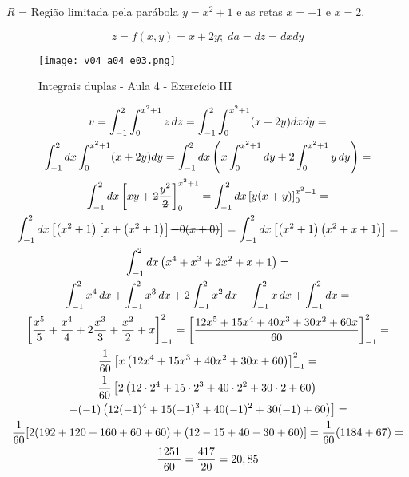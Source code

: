 \begin{enumerate}
	$R$ = Região limitada pela parábola $y = x^2 + 1$ e as retas $x = -1$ e $x = 2$.
	
	\begin{equation*}
		z = f(x,y) = x + 2y;\; da = dz = dx dy
	\end{equation*}
	
	\begin{figure}[htb]
		\caption{Integrais duplas - Aula 4 - Exercício III}
		\label{v04_a04_e03}
		\centering
		\texttt{[image: v04\_a04\_e03.png]}		
	\end{figure}
	
	\begin{gather*}
		v = \int_{-1}^2 \int_0^{x^2 + 1} z\, dz = \int_{-1}^2 \int_0^{x^2 + 1} (x + 2y) dx dy =\\ \int_{-1}^2 dx \int_0^{x^2 + 1} (x + 2y) dy = \int_{-1}^2 dx \left(x\int_0^{x^2 + 1} dy + 2\int_0^{x^2 + 1} y\, dy\right) =\\ \int_{-1}^2 dx \left[xy + \overstrike{2}\dfrac{y^2}{\overstrike{2}}\right]_0^{x^2 + 1} = \int_{-1}^2 dx \left[y(x + y)\right]_0^{x^2 + 1} =\\ \int_{-1}^2 dx \left[\left(x^2 + 1\right)\left[x + \left(x^2 + 1\right)\right] \overstrike{- 0(x + 0)}\right] = \int_{-1}^2 dx \left[\left(x^2 + 1\right)\left(x^2 + x + 1\right)\right] =\\ \int_{-1}^2 dx \left(x^4 + x^3 + 2x^2 + x + 1\right) =\\ \int_{-1}^2 x^4\, dx + \int_{-1}^2 x^3\, dx + 2\int_{-1}^2 x^2\, dx + \int_{-1}^2 x\, dx + \int_{-1}^2 dx =\\ \left[\dfrac{x^5}{5} + \dfrac{x^4}{4} + 2\dfrac{x^3}{3} + \dfrac{x^2}{2} + x\right]_{-1}^2 = \left[\dfrac{12x^5 + 15x^4 + 40x^3 + 30x^2 + 60x}{60}\right]_{-1}^2 =\\ \dfrac{1}{60}\left[x\left(12x^4 + 15x^3 + 40x^2 + 30x + 60\right)\right]_{-1}^2 =\\ \dfrac{1}{60}\left[2\left(12\cdot2^4 + 15\cdot2^3 + 40\cdot2^2 + 30\cdot2 + 60\right) \right.\\\left.- (-1)\left(12(-1)^4 + 15(-1)^3 + 40(-1)^2 + 30(-1) + 60\right)\right] =\\ \dfrac{1}{60} [2(192 + 120 + 160 + 60 + 60) + (12 - 15 + 40 - 30 + 60)] = \dfrac{1}{60} (1184 + 67) =\\ \dfrac{1251}{60} = \frac{417}{20} = 20,85
	\end{gather*}
\end{enumerate}
